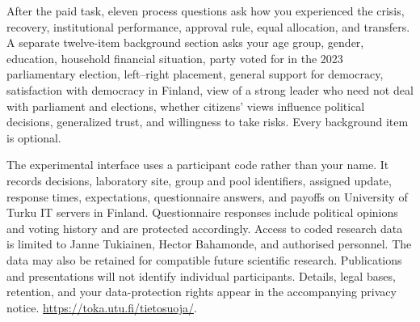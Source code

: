After the paid task, eleven process questions ask how you experienced the crisis, recovery, institutional performance, approval rule, equal allocation, and transfers. A separate twelve-item background section asks your age group, gender, education, household financial situation, party voted for in the 2023 parliamentary election, left--right placement, general support for democracy, satisfaction with democracy in Finland, view of a strong leader who need not deal with parliament and elections, whether citizens' views influence political decisions, generalized trust, and willingness to take risks. Every background item is optional. 


The experimental interface uses a participant code rather than your name. It records decisions, laboratory site, group and pool identifiers, assigned update, response times, expectations, questionnaire answers, and payoffs on University of Turku IT servers in Finland. Questionnaire responses include political opinions and voting history and are protected accordingly.  Access to coded research data is limited to Janne Tukiainen, Hector Bahamonde, and authorised personnel. The data may also be retained for compatible future scientific research. Publications and presentations will not identify individual participants. Details, legal bases, retention, and your data-protection rights appear in the accompanying privacy notice. \url{https://toka.utu.fi/tietosuoja/}.

